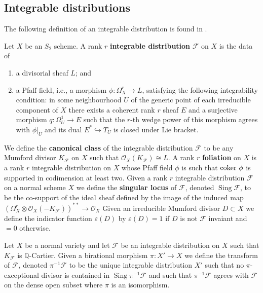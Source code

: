 \documentclass[12pt, a4paper]{amsart}
\DeclareMathOperator{\sing}{Sing}
\theoremstyle{definition}
\theoremstyle{named}
\begin{document}
\subsection{Integrable distributions}
\label{s_integrable_distribution}
The following definition of an integrable distribution is found in \cite[\S 2.2]{CS23b}.

Let $X$ be an $S_2$ scheme.
A rank $r$ {\bf integrable distribution} $\mathcal F$ on $X$ is the data of  
\begin{enumerate}
\item a divisorial sheaf $L$; and
\item a Pfaff field, i.e., a morphism $\phi\colon \Omega^r_X \rightarrow L$,
satisfying the following integrability condition:
in some neighbourhood $U$
of the generic point of each irreducible component of 
$X$ there exists a coherent rank $r$ sheaf $E$
and a surjective morphism $q\colon \Omega^1_U \rightarrow E$ such that the $r$-th wedge
power of this morphism agrees with $\phi|_U$ 
and its dual $E^*\hookrightarrow T_U$ is closed under Lie bracket. 
\end{enumerate}

We define the {\bf canonical class} of the integrable distribution $\mathcal F$ to be any Mumford divisor
$K_{\mathcal F}$ on $X$
such that $\mathcal O_X(K_{\mathcal F}) \cong L$.
  A rank $r$ {\bf foliation} on $X$ is a rank $r$ integrable distribution on $X$ whose Pfaff field $\phi$ is such that ${\rm coker}~ \phi$ 
is supported in codimension at least two. 
 Given a rank $r$ integrable distribution $\mathcal F$ on a normal scheme $X$ 
we define the {\bf singular locus} of $\mathcal F$, denoted $\sing \mathcal F$, to be the co-support
of the ideal sheaf defined by the image of  the induced map 
$(\Omega^r_X\otimes \mathcal O_X(-K_{\mathcal F}))^{**} \rightarrow \mathcal O_X$
Given an irreducible Mumford divisor $D \subset X$ we define the indicator function $\varepsilon(D)$ by $\varepsilon(D) = 1$ if $D$ is not $\mathcal F$ invaiant and $=0$ otherwise.



Let $X$ be a normal variety and let $\mathcal F$ be an integrable distribution 
on $X$ such that $K_{\mathcal F}$ is $\mathbb Q$-Cartier.
Given a birational morphism $\pi\colon X' \rightarrow X$
we define the transform of $\mathcal F$, denoted $\pi^{-1}\mathcal F$
to be the unique integrable distribution $X'$ such that no $\pi$-exceptional 
divisor is contained in $\sing \pi^{-1}\mathcal F$ and such that 
$\pi^{-1}\mathcal F$ agrees with $\mathcal F$ on the dense open subset where $\pi$ is an isomorphism.
\end{document}

